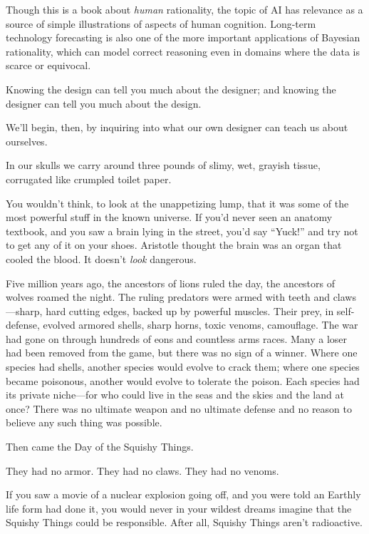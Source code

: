 {
 Though this is a book about \textit{human} rationality, the topic
of AI has relevance as a source of simple illustrations of aspects of
human cognition. Long-term technology forecasting is also one of the
more important applications of Bayesian rationality, which can model
correct reasoning even in domains where the data is scarce or
equivocal.}

{
 Knowing the design can tell you much about the designer; and
knowing the designer can tell you much about the design.}

{
 We'll begin, then, by inquiring into what our own
designer can teach us about ourselves.}

\myendsectiontext


{
 In our skulls we carry around three pounds of slimy, wet, grayish
tissue, corrugated like crumpled toilet paper.}

{
 You wouldn't think, to look at the unappetizing
lump, that it was some of the most powerful stuff in the known
universe. If you'd never seen an anatomy textbook, and
you saw a brain lying in the street, you'd say
``Yuck!'' and try not to get any of
it on your shoes. Aristotle thought the brain was an organ that cooled
the blood. It doesn't \textit{look} dangerous.}

{
 Five million years ago, the ancestors of lions ruled the day, the
ancestors of wolves roamed the night. The ruling predators were armed
with teeth and claws---sharp, hard cutting edges, backed up by powerful
muscles. Their prey, in self-defense, evolved armored shells, sharp
horns, toxic venoms, camouflage. The war had gone on through hundreds
of eons and countless arms races. Many a loser had been removed from
the game, but there was no sign of a winner. Where one species had
shells, another species would evolve to crack them; where one species
became poisonous, another would evolve to tolerate the poison. Each
species had its private niche---for who could live in the seas and the
skies and the land at once? There was no ultimate weapon and no
ultimate defense and no reason to believe any such thing was possible.}

{
 Then came the Day of the Squishy Things.}

{
 They had no armor. They had no claws. They had no venoms.}

{
 If you saw a movie of a nuclear explosion going off, and you were
told an Earthly life form had done it, you would never in your wildest
dreams imagine that the Squishy Things could be responsible. After all,
Squishy Things aren't radioactive.}

